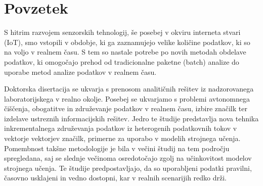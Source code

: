 % 
\chapter*{Povzetek}

S hitrim razvojem senzorskih tehnologij, še posebej v okviru interneta stvari (IoT), smo vstopili v obdobje, ki ga zaznamujejo velike količine podatkov, ki so na voljo v realnem času. 
S tem so nastale potrebe po novih metodah obdelave podatkov, ki omogočajo prehod od tradicionalne paketne (batch) analize do uporabe metod analize podatkov v realnem času.

Doktorska disertacija se ukvarja s prenosom analitičnih rešitev iz nadzorovanega laboratorijskega v realno okolje.
Posebej se ukvarjamo s problemi avtonomnega čiščenja, obogatitve in združevanje podatkov v realnem času, izbire značilk ter izdelave ustreznih informacijskih rešitev.
Jedro te študije predstavlja nova tehnika inkrementalnega združevanja podatkov iz heterogenih podatkovnih tokov v vektorje vektorjev značilk, primerne za uporabo v modelih strojnega učenja.
Pomembnost takšne metodologije je bila v večini študij na tem področju spregledana, saj se slednje večinoma osredotočajo zgolj na učinkovitost modelov strojnega učenja.
Te študije predpostavljajo, da so uporabljeni podatki pravilni, časovno usklajeni in vedno dostopni, kar v realnih scenarijih redko drži.

